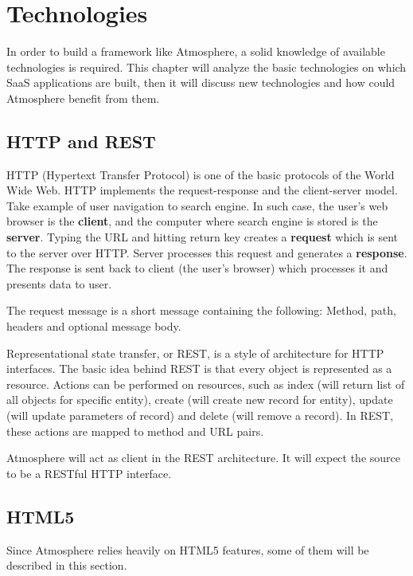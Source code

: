 \section{Technologies}

In order to build a framework like Atmosphere, a solid knowledge of available technologies is required. This chapter will analyze the basic technologies on which SaaS applications are built, then it will discuss new technologies and how could Atmosphere benefit from them.

\subsection{HTTP and REST}

HTTP (Hypertext Transfer Protocol) is one of the basic protocols of the World Wide Web. HTTP implements the request-response and the client-server model. Take example of user navigation to search engine. In such case, the user's web browser is the \textbf{client}, and the computer where search engine is stored is the \textbf{server}. Typing the URL and hitting return key creates a \textbf{request} which is sent to the server over HTTP. Server processes this request and generates a \textbf{response}. The response is sent back to client (the user's browser) which processes it and presents data to user.

The request message is a short message containing the following: Method, path, headers and optional message body.

Representational state transfer, or REST, is a style of architecture for HTTP interfaces. The basic idea behind REST is that every object is represented as a resource. Actions can be performed on resources, such as index (will return list of all objects for specific entity), create (will create new record for entity), update (will update parameters of record) and delete (will remove a record). In REST, these actions are mapped to method and URL pairs. \citep{rails_way}

Atmosphere will act as client in the REST architecture. It will expect the source to be a RESTful HTTP interface.

\subsection{HTML5}

Since Atmosphere relies heavily on HTML5 features, some of them will be described in this section. \citep{maccaw_js} \citep{html5_book} \citep{css3_book}


